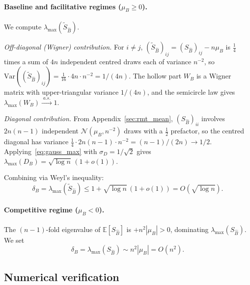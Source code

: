 \documentclass[pdflatex,sn-mathphys-num]{sn-jnl}%
\begin{document}
\begin{appendices}
\paragraph{Baseline and facilitative regimes ($\mu_B \geq 0$).} We compute $\lambda_{\max}(\tilde{S}_{\hat{B}})$.

\emph{Off-diagonal (Wigner) contribution.} For $i \neq j$, $(\tilde{S}_{\hat{B}})_{ij} = (S_{\hat{B}})_{ij} - n\mu_B$ is $\tfrac{1}{4}$ times a sum of $4n$ independent centred draws each of variance $n^{-2}$, so $\mathrm{Var}((\tilde{S}_{\hat{B}})_{ij}) = \tfrac{1}{16}\cdot 4n\cdot n^{-2} = 1/(4n)$. The hollow part $W_B$ is a Wigner matrix with upper-triangular variance $1/(4n)$, and the semicircle law gives $\lambda_{\max}(W_B) \xrightarrow{\;a.s.\;} 1$.

\emph{Diagonal contribution.} From Appendix~\ref{sec:rmt_mean}, $(S_{\hat{B}})_{ii}$ involves $2n(n-1)$ independent $\mathcal{N}(\mu_B, n^{-2})$ draws with a $\tfrac{1}{2}$ prefactor, so the centred diagonal has variance $\tfrac{1}{4}\cdot 2n(n-1)\cdot n^{-2} = (n-1)/(2n) \to 1/2$. Applying~\eqref{eq:gauss_max} with $\sigma_D = 1/\sqrt{2}$ gives $\lambda_{\max}(D_B) = \sqrt{\log n}\,(1+o(1))$.

Combining via Weyl's inequality:
\begin{equation}\label{eq:rmt_B}
\delta_B = \lambda_{\max}(\tilde{S}_{\hat{B}}) \leq 1 + \sqrt{\log n}\,(1+o(1)) = O(\sqrt{\log n}).
\end{equation}

\paragraph{Competitive regime ($\mu_B < 0$).} The $(n{-}1)$-fold eigenvalue of $\mathbb{E}[S_{\hat{B}}]$ is $+n^2|\mu_B| > 0$, dominating $\lambda_{\max}(S_{\hat{B}})$. We set
\begin{equation}\label{eq:rmt_B_comp}
\delta_B = \lambda_{\max}(S_{\hat{B}}) \sim n^2|\mu_B| = O(n^2).
\end{equation}

\subsection*{Numerical verification}


\end{appendices}
\end{document}
